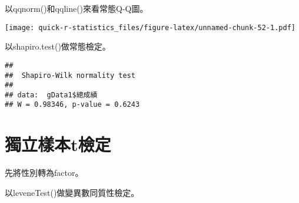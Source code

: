 \documentclass[
]{book}
\newenvironment{Shaded}{\begin{snugshade}}{\end{snugshade}}
\newcommand{\AttributeTok}[1]{\textcolor[rgb]{0.77,0.63,0.00}{#1}}
\newcommand{\FunctionTok}[1]{\textcolor[rgb]{0.00,0.00,0.00}{#1}}
\newcommand{\NormalTok}[1]{#1}
\newcommand{\OtherTok}[1]{\textcolor[rgb]{0.56,0.35,0.01}{#1}}
\newcommand{\SpecialCharTok}[1]{\textcolor[rgb]{0.00,0.00,0.00}{#1}}
\newcommand{\StringTok}[1]{\textcolor[rgb]{0.31,0.60,0.02}{#1}}
\begin{document}
以qqnorm()和qqline()來看常態Q-Q圖。

\begin{Shaded}
\end{Shaded}

\texttt{[image: quick-r-statistics\_files/figure-latex/unnamed-chunk-52-1.pdf]}

以shapiro.test()做常態檢定。

\begin{Shaded}
\end{Shaded}

\begin{verbatim}
## 
##  Shapiro-Wilk normality test
## 
## data:  gData1$總成績
## W = 0.98346, p-value = 0.6243
\end{verbatim}

\hypertarget{ux7368ux7acbux6a23ux672ctux6aa2ux5b9a}{%
\section{獨立樣本t檢定}\label{ux7368ux7acbux6a23ux672ctux6aa2ux5b9a}}

先將性別轉為factor。

\begin{Shaded}
\end{Shaded}

以leveneTest()做變異數同質性檢定。

\begin{Shaded}
\end{Shaded}
\end{document}
